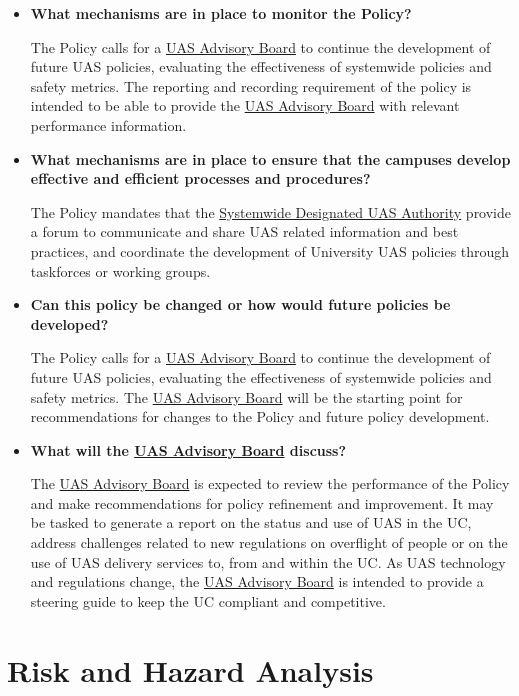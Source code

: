 \documentclass[
]{book}
\begin{document}
\begin{itemize}
\item
  \textbf{What mechanisms are in place to monitor the Policy?}

  The Policy calls for a \protect\hyperlink{AB}{UAS Advisory Board} to continue the development of future UAS policies, evaluating the effectiveness of systemwide policies and safety metrics. The reporting and recording requirement of the policy is intended to be able to provide the \protect\hyperlink{AB}{UAS Advisory Board} with relevant performance information.
\item
  \textbf{What mechanisms are in place to ensure that the campuses develop effective and efficient processes and procedures?}

  The Policy mandates that the \protect\hyperlink{SDA}{Systemwide Designated UAS Authority} provide a forum to communicate and share UAS related information and best practices, and coordinate the development of University UAS policies through taskforces or working groups.
\item
  \textbf{Can this policy be changed or how would future policies be developed?}

  The Policy calls for a \protect\hyperlink{AB}{UAS Advisory Board} to continue the development of future UAS policies, evaluating the effectiveness of systemwide policies and safety metrics. The \protect\hyperlink{AB}{UAS Advisory Board} will be the starting point for recommendations for changes to the Policy and future policy development.
\item
  \textbf{What will the \protect\hyperlink{AB}{UAS Advisory Board} discuss?}

  The \protect\hyperlink{AB}{UAS Advisory Board} is expected to review the performance of the Policy and make recommendations for policy refinement and improvement. It may be tasked to generate a report on the status and use of UAS in the UC, address challenges related to new regulations on overflight of people or on the use of UAS delivery services to, from and within the UC. As UAS technology and regulations change, the \protect\hyperlink{AB}{UAS Advisory Board} is intended to provide a steering guide to keep the UC compliant and competitive.
\end{itemize}

\hypertarget{ch-risk-analysis}{%
\chapter{Risk and Hazard Analysis}\label{ch-risk-analysis}}
\end{document}
